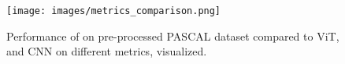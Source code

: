 \begin{figure}[b]
    \centering
    \vspace{-1.5em}
    \texttt{[image: images/metrics\_comparison.png]}
    \caption{\centering Performance of \ENACT on pre-processed PASCAL dataset \cite{bentley_pascal_nodate} compared to ViT, and CNN on different metrics, visualized.}
    \label{fig:bar_graph}
\end{figure}
